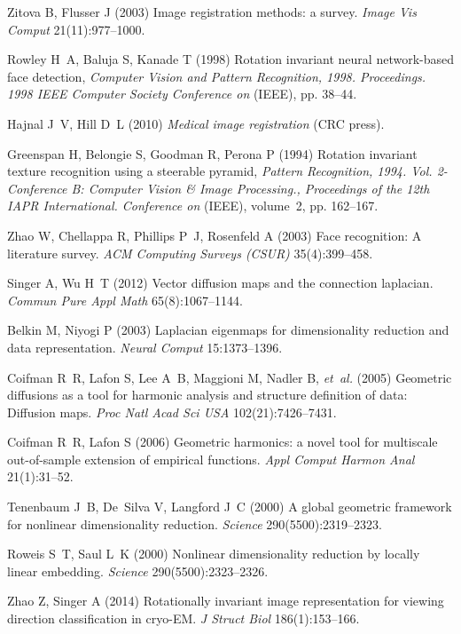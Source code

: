 \documentclass{pnastwo}
\begin{document}
\begin{article}
\begin{thebibliography}{10}
Zitova B, Flusser J (2003) Image registration methods: a survey. \textit{Image Vis Comput} 21(11):977--1000.

Rowley H~A, Baluja S, Kanade T (1998) Rotation invariant neural network-based
  face detection, \textit{Computer Vision and Pattern Recognition, 1998.
  Proceedings. 1998 IEEE Computer Society Conference on} (IEEE), pp. 38--44.

Hajnal J~V, Hill D~L (2010) \textit{Medical image registration} (CRC press).

Greenspan H, Belongie S, Goodman R, Perona P (1994) Rotation invariant texture
  recognition using a steerable pyramid, \textit{Pattern Recognition, 1994.
  Vol. 2-Conference B: Computer Vision \& Image Processing., Proceedings of the
  12th IAPR International. Conference on} (IEEE), volume~2, pp. 162--167.

Zhao W, Chellappa R, Phillips P~J, Rosenfeld A (2003) Face recognition: A
  literature survey. \textit{ACM Computing Surveys (CSUR)} 35(4):399--458.

Singer A, Wu H~T (2012) Vector diffusion maps and the connection laplacian.
  \textit{Commun Pure Appl Math} 65(8):1067--1144.

Belkin M, Niyogi P (2003) Laplacian eigenmaps for dimensionality reduction and
  data representation. \textit{Neural Comput} 15:1373--1396.

Coifman R~R, Lafon S, Lee A~B, Maggioni M, Nadler B, \textit{et~al.} (2005)
  Geometric diffusions as a tool for harmonic analysis and structure definition
  of data: Diffusion maps. \textit{Proc Natl Acad Sci USA} 102(21):7426--7431.

Coifman R~R, Lafon S (2006) Geometric harmonics: a novel tool for multiscale
  out-of-sample extension of empirical functions. \textit{Appl Comput Harmon Anal} 21(1):31--52.

Tenenbaum J~B, De~Silva V, Langford J~C (2000) A global geometric framework for
  nonlinear dimensionality reduction. \textit{Science} 290(5500):2319--2323.

Roweis S~T, Saul L~K (2000) Nonlinear dimensionality reduction by locally
  linear embedding. \textit{Science} 290(5500):2323--2326.

Zhao Z, Singer A (2014) Rotationally invariant image representation for
viewing direction classification in cryo-EM. \textit{J Struct Biol} 186(1):153--166.


\end{thebibliography}
\end{article}
\end{document}
